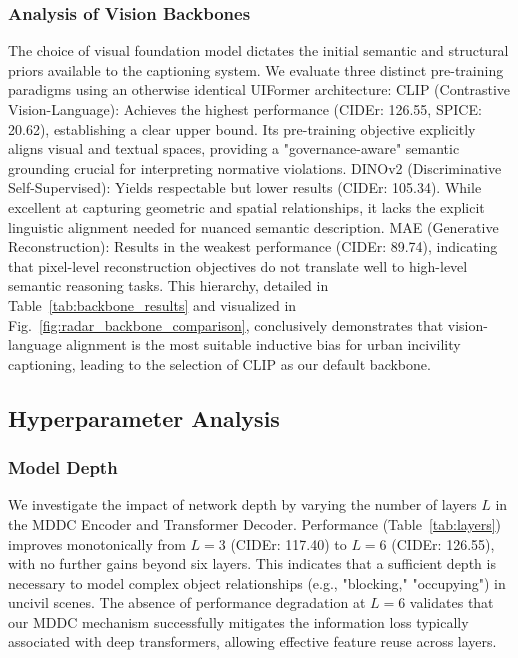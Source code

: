 \documentclass[lettersize,journal]{IEEEtran}
\begin{document}
	\subsubsection{Analysis of Vision Backbones}
	
	The choice of visual foundation model dictates the initial semantic and structural priors available to the captioning system. We evaluate three distinct pre-training paradigms using an otherwise identical UIFormer architecture:
	CLIP (Contrastive Vision-Language): Achieves the highest performance (CIDEr: 126.55, SPICE: 20.62), establishing a clear upper bound. Its pre-training objective explicitly aligns visual and textual spaces, providing a "governance-aware" semantic grounding crucial for interpreting normative violations.
	DINOv2 (Discriminative Self-Supervised): Yields respectable but lower results (CIDEr: 105.34). While excellent at capturing geometric and spatial relationships, it lacks the explicit linguistic alignment needed for nuanced semantic description.
	MAE (Generative Reconstruction): Results in the weakest performance (CIDEr: 89.74), indicating that pixel-level reconstruction objectives do not translate well to high-level semantic reasoning tasks.
	This hierarchy, detailed in Table~\ref{tab:backbone_results} and visualized in Fig.~\ref{fig:radar_backbone_comparison}, conclusively demonstrates that vision-language alignment is the most suitable inductive bias for urban incivility captioning, leading to the selection of CLIP as our default backbone.
	
	\subsection{Hyperparameter Analysis}
	
	\subsubsection{Model Depth}
	
	We investigate the impact of network depth by varying the number of layers \(L\) in the MDDC Encoder and Transformer Decoder. Performance (Table~\ref{tab:layers}) improves monotonically from \(L=3\) (CIDEr: 117.40) to \(L=6\) (CIDEr: 126.55), with no further gains beyond six layers. This indicates that a sufficient depth is necessary to model complex object relationships (e.g., "blocking," "occupying") in uncivil scenes. The absence of performance degradation at \(L=6\) validates that our MDDC mechanism successfully mitigates the information loss typically associated with deep transformers, allowing effective feature reuse across layers.
	
\end{document}
